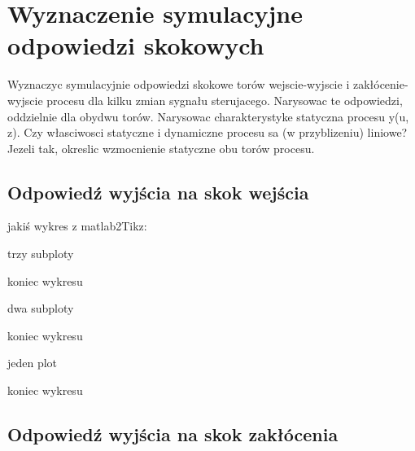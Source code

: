 \section{Wyznaczenie symulacyjne odpowiedzi skokowych}

Wyznaczyc symulacyjnie odpowiedzi skokowe torów wejscie-wyjscie i zakłócenie-wyjscie
procesu dla kilku zmian sygnału sterujacego. Narysowac te odpowiedzi, oddzielnie dla
obydwu torów. Narysowac charakterystyke statyczna procesu y(u, z). Czy własciwosci
statyczne i dynamiczne procesu sa (w przyblizeniu) liniowe? Jezeli tak, okreslic
wzmocnienie statyczne obu torów procesu.

\subsection{Odpowiedź wyjścia na skok wejścia}

jakiś wykres z matlab2Tikz:

trzy subploty



koniec wykresu

dwa subploty



koniec wykresu

jeden plot



koniec wykresu 

\subsection{Odpowiedź wyjścia na skok zakłócenia}
